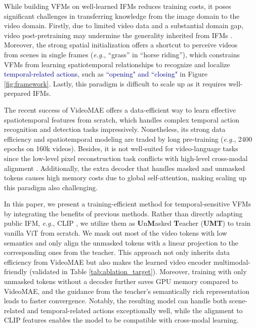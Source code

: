 \documentclass[10pt,twocolumn,letterpaper]{article}
\def\Modelname{\textbf{UMT}}
\newcommand{\darkblue}[1]{\textcolor{darkblue}{#1}}
\begin{document}
While building VFMs on well-learned IFMs reduces training costs, 
it poses significant challenges in transferring knowledge from the image domain to the video domain.
Firstly,
due to limited video data and a substantial domain gap,
video post-pretraining may undermine the generality inherited from IFMs \cite{xue2022clip}. 
Moreover, 
the strong spatial initialization offers a shortcut to perceive videos from scenes in single frames (\textit{e.g.}, ``grass'' in ``horse riding''),
which constrains VFMs from learning spatiotemporal relationships to recognize and localize \darkblue{temporal-related actions}, 
such as \darkblue{``opening" and ``closing"} in Figure \ref{fig:framework}.
Lastly, this paradigm is difficult to scale up as it requires well-prepared IFMs.

The recent success of VideoMAE \cite{videomae, st_mae} offers a data-efficient way to learn effective spatiotemporal features from scratch,
which handles complex temporal action recognition and detection tasks impressively. 
Nonetheless, 
its strong data efficiency and spatiotemporal modeling are traded by long pre-training (\textit{e.g.}, 2400 epochs on 160k videos). 
Besides, 
it is not well-suited for video-language tasks since the low-level pixel reconstruction task conflicts with high-level cross-modal alignment \cite{Shu2022MaskedCP}.
Additionally, 
the extra decoder that handles masked and unmasked tokens causes high memory costs due to global self-attention,
making scaling up this paradigm also challenging.

In this paper, 
we present a training-efficient method for temporal-sensitive VFMs by integrating the benefits of previous methods. 
Rather than directly adapting public IFM, \textit{e.g.}, CLIP \cite{clip}, 
we utilize them as \textbf{U}n\textbf{M}asked \textbf{T}eacher (\Modelname) to train vanilla ViT from scratch. 
We mask out most of the video tokens with low semantics and only align the unmasked tokens with a linear projection to the corresponding ones from the teacher. 
This approach not only inherits data efficiency from VideoMAE but also makes the learned video encoder multimodal-friendly (validated in Table \ref{tab:ablation_target}). 
Moreover,
training with only unmasked tokens without a decoder further saves GPU memory compared to VideoMAE,
and the guidance from the teacher's semantically rich representation leads to faster convergence. 
Notably, 
the resulting model can handle both scene-related \cite{k400,mit} and temporal-related actions \cite{sth,ava} exceptionally well, 
while the alignment to CLIP features enables the model to be compatible with cross-modal learning.
\end{document}
